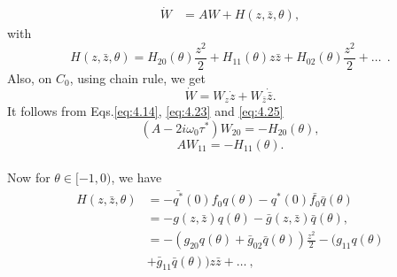 \documentclass[10pt]{amsart}
\theoremstyle{definition}
\begin{document}
\begin{align}\label{eq:4.23}
\dot{W} &= A W + H (z, \bar{z}, \theta),
\end{align}
with\\
\begin{equation}\label{eq:4.24}
H(z,\bar z,\theta)=H_{20}(\theta)\frac{z^2}{2}+H_{11}(\theta) z \bar z+H_{02}(\theta)\frac{z^2}{2}+\ldots~~.
\end{equation}
Also, on $C_0$, using chain rule, we get
\begin{equation}\label{eq:4.25}
 \dot{W}=W_z \dot{z}+W_{\bar z} \dot{\bar z}.
\end{equation}
It follows from Eqs.\eqref{eq:4.14}, \eqref{eq:4.23} and \eqref{eq:4.25}
\begin{equation}\label{eq:4.26}
(A-2i\omega_0 \tau^*)W_{20}=-H_{20}(\theta),
\end{equation}
\begin{equation}\label{eq:4.27}
 AW_{11}=-H_{11}(\theta).
\end{equation}
\\
 Now for $\theta \in [-1,0)$, we have
 \begin{align}\label{eq:4.28}
 H(z,\bar z,\theta)&=-\bar{q^*}(0) f_0 q(\theta)-q^*(0) \bar{f_0} \bar{q}(\theta)\nonumber\\
 &=-g(z,\bar z)q(\theta)-\bar g(z,\bar z)\bar q(\theta),\\
 &=-(g_{20}q(\theta)+{\bar{g}}_{02}\bar q(\theta))\frac{z^2}{2}-(g_{11}q(\theta)\nonumber\\
 &+{\bar g}_{11} {\bar q}(\theta))z \bar z+\ldots ~,\nonumber
 \end{align}
 
\end{document}
